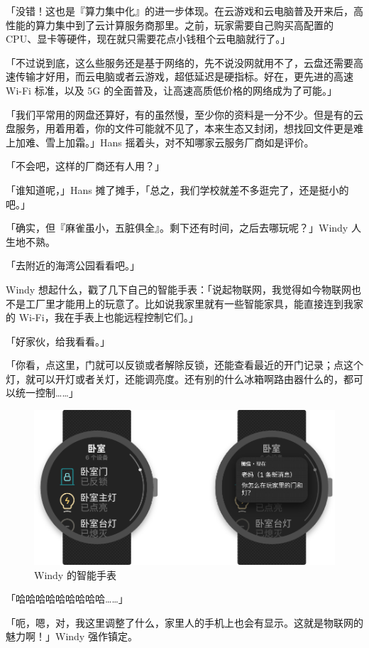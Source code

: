 「没错！这也是『算力集中化』的进一步体现。在云游戏和云电脑普及开来后，高性能的算力集中到了云计算服务商那里。之前，玩家需要自己购买高配置的 CPU、显卡等硬件，现在就只需要花点小钱租个云电脑就行了。」

「不过说到底，这么些服务还是基于网络的，先不说没网就用不了，云盘还需要高速传输才好用，而云电脑或者云游戏，超低延迟是硬指标。好在，更先进的高速 Wi-Fi 标准，以及 5G 的全面普及，让高速高质低价格的网络成为了可能。」

「我们平常用的网盘还算好，有的虽然慢，至少你的资料是一分不少。但是有的云盘服务，用着用着，你的文件可能就不见了，本来生态又封闭，想找回文件更是难上加难、雪上加霜。」Hans 摇着头，对不知哪家云服务厂商如是评价。

「不会吧，这样的厂商还有人用？」

「谁知道呢，」Hans 摊了摊手，「总之，我们学校就差不多逛完了，还是挺小的吧。」

「确实，但『麻雀虽小，五脏俱全』。剩下还有时间，之后去哪玩呢？」Windy 人生地不熟。

「去附近的海湾公园看看吧。」

Windy 想起什么，戳了几下自己的智能手表：「说起物联网，我觉得如今物联网也不是工厂里才能用上的玩意了。比如说我家里就有一些智能家具，能直接连到我家的 Wi-Fi，我在手表上也能远程控制它们。」

「好家伙，给我看看。」

「你看，点这里，门就可以反锁或者解除反锁，还能查看最近的开门记录；点这个灯，就可以开灯或者关灯，还能调亮度。还有别的什么冰箱啊路由器什么的，都可以统一控制……」

\begin{figure}[htb!]
  \centering
  \includegraphics[width=.8\textwidth]{assets/surpass/Smart_watch.pdf}
  \caption{Windy 的智能手表}
  \label{fig:Smart_watch}
\end{figure}

「哈哈哈哈哈哈哈哈哈……」

「呃，嗯，对，我这里调整了什么，家里人的手机上也会有显示。这就是物联网的魅力啊！」Windy 强作镇定。

